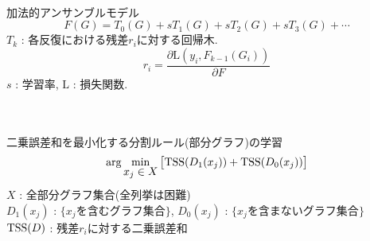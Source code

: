 \begin{tcolorbox}[colbacktitle=gray, title={\fontsize{35pt}{0pt}\selectfont 非線形グラフ分類回帰モデル}]
	 \\
	\vspace*{-10pt} 
	

	\vspace*{-20pt} 
	 \\
	\vspace*{5pt} \\
	加法的アンサンブルモデル
	\begin{equation}
		F(G) = T_0(G) + s T_1(G) + s T_2(G) + s T_3(G) + \cdots
	\end{equation}
	$T_k$ : 各反復における残差$r_i$に対する回帰木.
	\begin{equation}
		r_i = \frac{\partial \mathrm{L}(y_i, F_{k-1}(G_i))}{\partial F}
	\end{equation}
	\color{ash}
	$s$ : 学習率, \hspace{10pt} $\mathrm{L}$ : 損失関数.
	\vspace*{20pt} 

	\color{black}
	 \\
	\vspace*{5pt} \\
	二乗誤差和を最小化する分割ルール(部分グラフ)の学習
	\begin{equation}
		\arg\mymin{x_j \in X} \big[ \TSS(D_1(x_j)) + \TSS(D_0(x_j)) \big]
		\label{min:internal}
		\vspace{-5pt}
	\end{equation}
	$X$ : 全部分グラフ集合(\alert{全列挙は困難}) \\
	$D_1(x_j)$ : $ \{x_j$を含むグラフ集合$\}$, \hspace{30pt} $D_0(x_j)$ : $ \{x_j$を含まないグラフ集合$\}$ \\
	$\mathrm{TSS}(D)$ : 残差$r_i$に対する二乗誤差和 \\
	\vspace{-10pt}
\end{tcolorbox}
